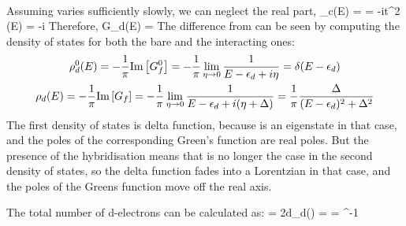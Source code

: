 \documentclass[14pt]{extarticle}
\numberwithin{equation}{section}
\begin{document}
{\begin{gather}
\end{gather}
Assuming  varies sufficiently slowly, we can neglect the real part,
\beq
\Sigma_c(E) =  = -i\pi t^2 \rho(E) = -i\Delta
\eeq
Therefore,
\beq
G_d(E) = 
\eeq
The difference from  can be seen by computing the density of states for both the bare and the interacting ones:
\begin{gather}
	\rho_d^0(E) = -\frac{1}{\pi}\text{Im}\left[{G^0_f}\right] = -\frac{1}{\pi} \lim_{\eta \rightarrow 0} \frac{1}{E - \epsilon_d + i\eta} = \delta(E - \epsilon_d)\\
	\rho_d(E) = -\frac{1}{\pi}\text{Im}\left[{G_f}\right]= -\frac{1}{\pi} \lim_{\eta \rightarrow 0} \frac{1}{E - \epsilon_d + i(\eta+\Delta)} = \frac{1}{\pi}\frac{\Delta}{(E-\epsilon_d)^2 + \Delta^2}\label{densitys}
\end{gather}
The first density of states is delta function, because  is an eigenstate in that case, and the poles of the corresponding Green's function are real poles.
But the presence of the hybridisation means that is no longer the case in the second density of states, so the delta function fades into a Lorentzian in that case, and the poles of the Greens function move off the real axis.

The total number of d-electrons can be calculated as:
\beq[total]
 = 2\int d\epsilon \rho_d(\epsilon) = \fr{2\Delta}{\pi} \int {} = \cot^{-1}
\eeq
}
\end{document}
